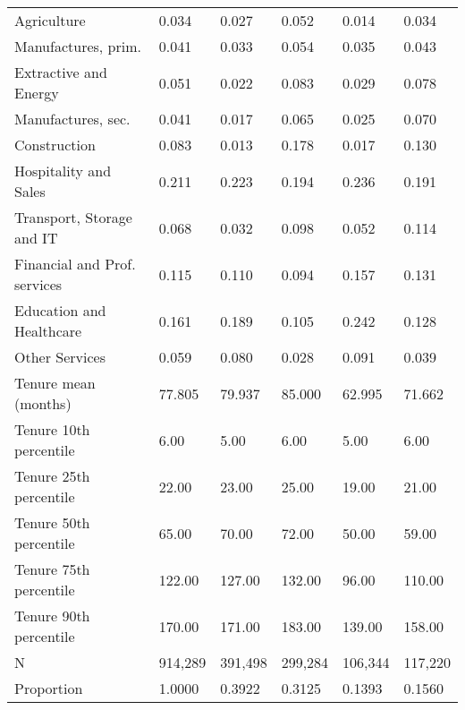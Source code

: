 \begin{tabular}{llllll}
Agriculture                  &    0.034 &    0.027 &    0.052 &              0.014 &            0.034 \\
Manufactures, prim.          &    0.041 &    0.033 &    0.054 &              0.035 &            0.043 \\
Extractive and Energy        &    0.051 &    0.022 &    0.083 &              0.029 &            0.078 \\
Manufactures, sec.           &    0.041 &    0.017 &    0.065 &              0.025 &            0.070 \\
Construction                 &    0.083 &    0.013 &    0.178 &              0.017 &            0.130 \\
Hospitality and Sales        &    0.211 &    0.223 &    0.194 &              0.236 &            0.191 \\
Transport, Storage and IT    &    0.068 &    0.032 &    0.098 &              0.052 &            0.114 \\
Financial and Prof. services &    0.115 &    0.110 &    0.094 &              0.157 &            0.131 \\
Education and Healthcare     &    0.161 &    0.189 &    0.105 &              0.242 &            0.128 \\
Other Services               &    0.059 &    0.080 &    0.028 &              0.091 &            0.039 \\
Tenure mean (months)         &   77.805 &   79.937 &   85.000 &             62.995 &           71.662 \\
Tenure 10th percentile       &     6.00 &     5.00 &     6.00 &               5.00 &             6.00 \\
Tenure 25th percentile       &    22.00 &    23.00 &    25.00 &              19.00 &            21.00 \\
Tenure 50th percentile       &    65.00 &    70.00 &    72.00 &              50.00 &            59.00 \\
Tenure 75th percentile       &   122.00 &   127.00 &   132.00 &              96.00 &           110.00 \\
Tenure 90th percentile       &   170.00 &   171.00 &   183.00 &             139.00 &           158.00 \\
N                            &  914,289 &  391,498 &  299,284 &            106,344 &          117,220 \\
Proportion                   &   1.0000 &   0.3922 &   0.3125 &             0.1393 &           0.1560 \\
\bottomrule
\end{tabular}
